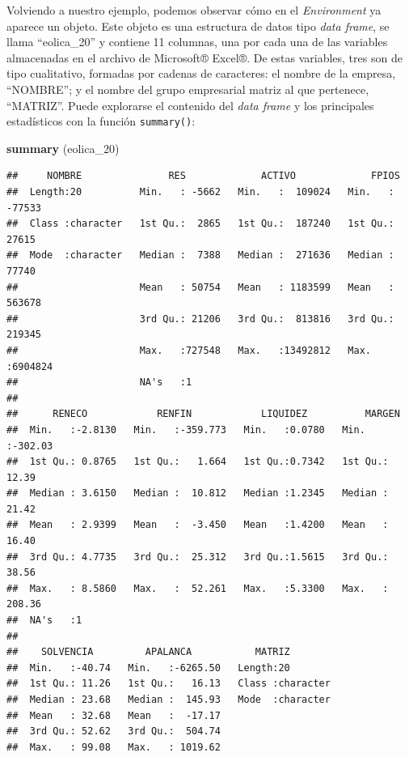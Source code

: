 \documentclass[
]{book}
\newenvironment{Shaded}{\begin{snugshade}}{\end{snugshade}}
\newcommand{\FunctionTok}[1]{\textcolor[rgb]{0.13,0.29,0.53}{\textbf{#1}}}
\newcommand{\NormalTok}[1]{#1}
\begin{document}
Volviendo a nuestro ejemplo, podemos observar cómo en el \emph{Environment} ya aparece un objeto. Este objeto es una estructura de datos tipo \emph{data frame}, se llama ``eolica\_20'' y contiene 11 columnas, una por cada una de las variables almacenadas en el archivo de Microsoft® Excel®. De estas variables, tres son de tipo cualitativo, formadas por cadenas de caracteres: el nombre de la empresa, ``NOMBRE''; y el nombre del grupo empresarial matriz al que pertenece, ``MATRIZ''. Puede explorarse el contenido del \emph{data frame} y los principales estadísticos con la función \texttt{summary()}:

\begin{Shaded}
\begin{Highlighting}[]
\FunctionTok{summary}\NormalTok{ (eolica\_20)}
\end{Highlighting}
\end{Shaded}

\begin{verbatim}
##     NOMBRE               RES             ACTIVO             FPIOS        
##  Length:20          Min.   : -5662   Min.   :  109024   Min.   : -77533  
##  Class :character   1st Qu.:  2865   1st Qu.:  187240   1st Qu.:  27615  
##  Mode  :character   Median :  7388   Median :  271636   Median :  77740  
##                     Mean   : 50754   Mean   : 1183599   Mean   : 563678  
##                     3rd Qu.: 21206   3rd Qu.:  813816   3rd Qu.: 219345  
##                     Max.   :727548   Max.   :13492812   Max.   :6904824  
##                     NA's   :1                                            
## 
##      RENECO            RENFIN            LIQUIDEZ          MARGEN       
##  Min.   :-2.8130   Min.   :-359.773   Min.   :0.0780   Min.   :-302.03  
##  1st Qu.: 0.8765   1st Qu.:   1.664   1st Qu.:0.7342   1st Qu.:  12.39  
##  Median : 3.6150   Median :  10.812   Median :1.2345   Median :  21.42  
##  Mean   : 2.9399   Mean   :  -3.450   Mean   :1.4200   Mean   :  16.40  
##  3rd Qu.: 4.7735   3rd Qu.:  25.312   3rd Qu.:1.5615   3rd Qu.:  38.56  
##  Max.   : 8.5860   Max.   :  52.261   Max.   :5.3300   Max.   : 208.36  
##  NA's   :1                                                              
## 
##    SOLVENCIA         APALANCA           MATRIZ         
##  Min.   :-40.74   Min.   :-6265.50   Length:20         
##  1st Qu.: 11.26   1st Qu.:   16.13   Class :character  
##  Median : 23.68   Median :  145.93   Mode  :character  
##  Mean   : 32.68   Mean   :  -17.17                     
##  3rd Qu.: 52.62   3rd Qu.:  504.74                     
##  Max.   : 99.08   Max.   : 1019.62
\end{verbatim}
\end{document}
